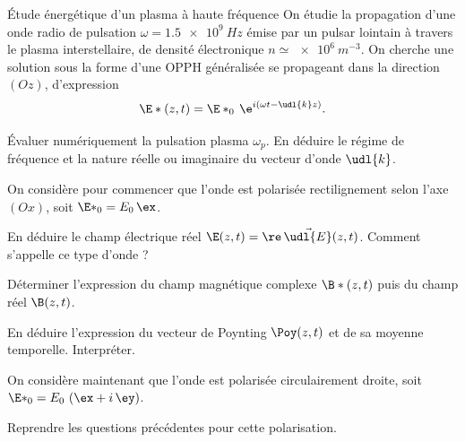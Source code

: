 \begin{exo}[PC][1][TD]{Étude énergétique d'un plasma à haute fréquence}
  On étudie la propagation d'une onde radio de pulsation $\omega = \SI{1.5e9}{Hz}$ émise par un pulsar lointain à travers le plasma interstellaire, de densité électronique $n \simeq \SI{e6}{m^{-3}}$. On cherche une solution sous la forme d'une OPPH généralisée se propageant dans la direction $(Oz)$, d'expression 
  \begin{equation}
    \E*(z,t) = \E*_0 \,\e^{i(\omega t - \udl{k} z)}. 
  \end{equation}

  \begin{quest}
    \item	Évaluer numériquement la pulsation plasma $\omega_p$. En déduire le régime de fréquence et la nature réelle ou imaginaire du vecteur d'onde $\udl{k}$.
  \end{quest}

  On considère pour commencer que l'onde est polarisée rectilignement selon l'axe $(Ox)$, soit $\E*_0 = E_0 \,\ex$.
  \begin{quest}
    \item	En déduire le champ électrique réel $\E(z,t) = \re\,\Vec{\udl{E}}(z,t)$. Comment s'appelle ce type d'onde ?
    \item Déterminer l'expression du champ magnétique complexe $\B*(z,t)$ puis du champ réel $\B(z,t)$.
    \item En déduire l'expression du vecteur de Poynting $\Poy(z,t)$ et de sa moyenne temporelle. Interpréter.
  \end{quest}
  On considère maintenant que l'onde est polarisée circulairement droite, soit $\E*_0 = E_0 \,\left(\ex + i\,\ey\right)$.
  \begin{quest}
    \item	Reprendre les questions précédentes pour cette polarisation.
  \end{quest}
\end{exo}


